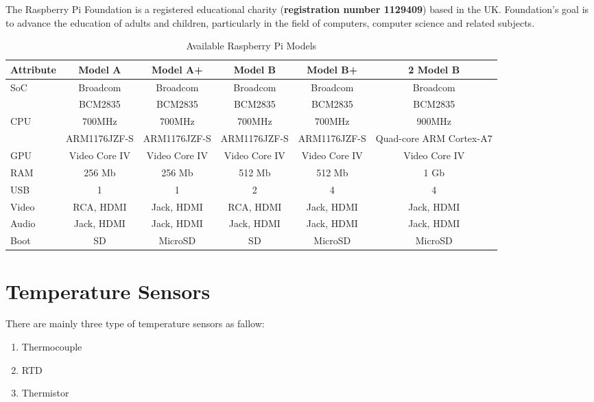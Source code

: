 \documentclass[a4paper,12pt]{report}
\begin{document}
The Raspberry Pi Foundation is a registered educational charity (\textbf{registration number 1129409}) based in the UK. 
Foundation’s goal is to advance the education of adults and children, particularly in the field of computers, 
computer science and related subjects.
\begin{landscape}
\begin{table}[h]
\caption{Available Raspberry Pi Models }
\begin{tabular}{|l|c|c|c|c|c|}\hline
Attribute& Model A	& Model A+	& Model B	& Model B+	& 2 Model B	\\\hline
SoC	& Broadcom	& Broadcom	& Broadcom	& Broadcom	& Broadcom	\\
	& BCM2835	& BCM2835	& BCM2835	& BCM2835	& BCM2835	\\ \hline
CPU	& 700MHz	& 700MHz	& 700MHz	& 700MHz	& 900MHz 	\\
	& ARM1176JZF-S	& ARM1176JZF-S	& ARM1176JZF-S	& ARM1176JZF-S	& Quad-core ARM Cortex-A7 \\ \hline
GPU	& Video Core IV	& Video Core IV	& Video Core IV	& Video Core IV	& Video Core IV	\\ \hline
RAM	& 256 Mb	& 256 Mb	& 512 Mb	& 512 Mb	& 1 Gb		\\ \hline
USB	&1		&1		&2		&4		&4		\\ \hline
Video	& RCA, HDMI	& Jack, HDMI	& RCA, HDMI	& Jack, HDMI	& Jack, HDMI	\\ \hline
Audio 	& Jack, HDMI	& Jack, HDMI	& Jack, HDMI	& Jack, HDMI	& Jack, HDMI	\\	\hline
Boot	& SD		& MicroSD	& SD		& MicroSD	& MicroSD	\\ \hline
\end{tabular}
\end{table}
\end{landscape}




\section{Temperature Sensors}
There are mainly three type of temperature sensors as fallow:
\begin{enumerate}
  \item Thermocouple
  \item RTD
  \item Thermistor 
\end{enumerate}
\end{document}
